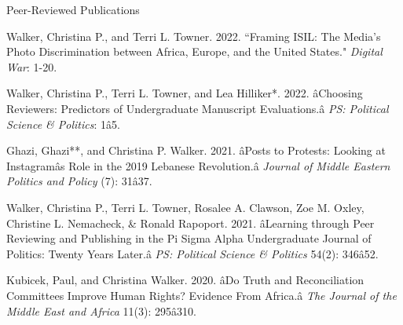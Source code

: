 \documentclass{resume} %
\begin{document}
\begin{rSection}{Peer-Reviewed Publications}
\begin{etaremune}
\item Walker, Christina P., and Terri L. Towner. 2022. ``Framing ISIL: The Media's Photo Discrimination between Africa, Europe, and the United States." \textit{Digital War}: 1-20.\href{https://link.springer.com/article/10.1057/s42984-022-00044-7}{}  

\item Walker, Christina P., Terri L. Towner, and Lea Hilliker*. 2022. âChoosing Reviewers: Predictors of Undergraduate Manuscript Evaluations.â \textit{PS: Political Science \& Politics}: 1â5.\href{https://www.cambridge.org/core/journals/ps-political-science-and-politics/article/choosing-reviewers-predictors-of-undergraduate-manuscript-evaluations/AE52D3F5932D2FACDA39DB3212522D45}{ }

\item Ghazi, Ghazi**, and Christina P. Walker. 2021. âPosts to Protests: Looking at Instagramâs Role in the 2019 Lebanese Revolution.â \textit{Journal of Middle Eastern Politics and Policy} (7): 31â37.\href{https://www.researchgate.net/profile/Christina-Walker-5/publication/361944213_Spring_2021_Posts_to_Protests_Looking_at_Instagram's_Role_in_the_2019_Lebanese_Revolution/links/62cdd11e6151ad090b960b72/Spring-2021-Posts-to-Protests-Looking-at-Instagrams-Role-in-the-2019-Lebanese-Revolution.pdf}{}

\item Walker, Christina P., Terri L. Towner, Rosalee A. Clawson, Zoe M. Oxley, Christine L. Nemacheck, \& Ronald Rapoport. 2021. âLearning through Peer Reviewing and Publishing in the Pi Sigma Alpha Undergraduate Journal of Politics: Twenty Years Later.â \textit{PS: Political Science \& Politics} 54(2): 346â52.\href{https://www.cambridge.org/core/journals/ps-political-science-and-politics/article/learning-through-peer-reviewing-and-publishing-in-the-pi-sigma-alpha-undergraduate-journal-of-politics-twenty-years-later/CF2910FBB8C381BAFEBE32A663D21172}{}

\item Kubicek, Paul, and Christina Walker. 2020. âDo Truth and Reconciliation Committees Improve Human Rights? Evidence From Africa.â \textit{The Journal of the Middle East and Africa} 11(3): 295â310.\href{https://www.tandfonline.com/doi/abs/10.1080/21520844.2020.1808401}{}

\end{etaremune}
\end{rSection}
\end{document}
